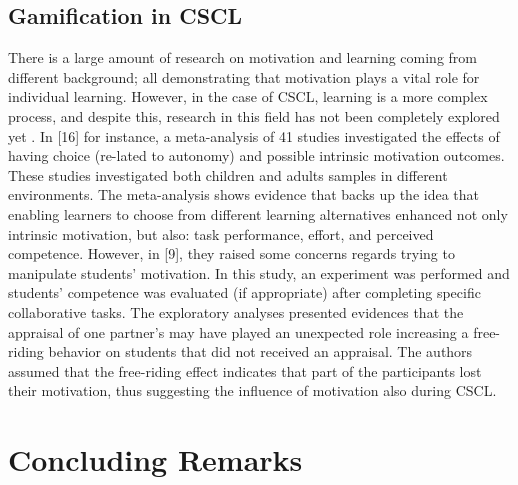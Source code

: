 
\subsection{Gamification in CSCL}

There is a large amount of research on motivation and learning coming from different background; all demonstrating that motivation plays a vital role for individual learning. However, in the case of CSCL, learning is a more complex process, and despite this, research in this field has not been completely explored yet \cite{Motivation_in_a_computer-supported_collaborative_learning}. In [16] for instance, a meta-analysis of 41 studies investigated the effects of having choice (re-lated to autonomy) and possible intrinsic motivation outcomes. These studies investigated both children and adults samples in different environments. The meta-analysis shows evidence that backs up the idea that enabling learners to choose from different learning alternatives enhanced not only intrinsic motivation, but also: task performance, effort, and perceived competence. However, in [9], they raised some concerns regards trying to manipulate students’ motivation. In this study, an experiment was performed and students' competence was evaluated (if appropriate) after completing specific collaborative tasks. The exploratory analyses presented evidences that the appraisal of one partner’s may have played an unexpected role increasing a free-riding behavior on students that did not received an appraisal. The authors assumed that the free-riding effect indicates that part of the participants lost their motivation, thus suggesting the influence of motivation also during CSCL. 

\section{Concluding Remarks}
